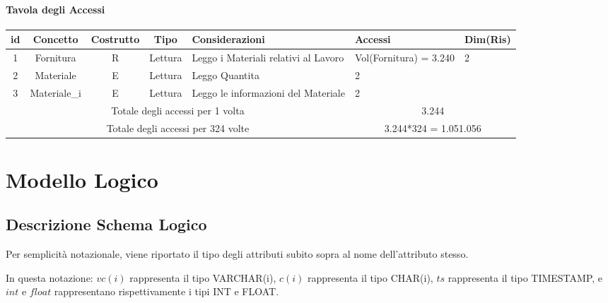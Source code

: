 \documentclass[12pt,a4paper]{report}
\begin{document}
        \subsection{Tavola degli Accessi}
        \begin{tabular}{|c|c|c|c|p{4cm}|p{3cm}|p{3cm}|}
            \hline
            \textbf{id} & \textbf{Concetto} & \textbf{Costrutto} & \textbf{Tipo} & \textbf{Considerazioni} & \textbf{Accessi} & \textbf{Dim(Ris)} \\ \hline
            1 & Fornitura & R & Lettura & Leggo i Materiali relativi al Lavoro & Vol(Fornitura) = 3.240 & 2 \\ \hline
            2 & Materiale & E & Lettura & Leggo Quantita & 2 & ~ \\ \hline
            3 & Materiale\_i & E & Lettura & Leggo le informazioni del Materiale & 2 & ~ \\ \hline
            \multicolumn{5}{|c|}{Totale degli accessi per 1 volta} & \multicolumn{2}{|c|}{3.244} \\ \hline
            \multicolumn{5}{|c|}{Totale degli accessi per 324 volte} & \multicolumn{2}{|c|}{3.244*324 = 1.051.056} \\ \hline
        \end{tabular}

\part{Modello Logico}

    \chapter{Descrizione Schema Logico}
    Per semplicità notazionale, viene riportato il tipo degli attributi subito sopra al nome dell'attributo stesso.

    In questa notazione: $vc(i)$ rappresenta il tipo VARCHAR(i), $c(i)$ rappresenta il tipo CHAR(i), $ts$ rappresenta il tipo TIMESTAMP, e $int$ e $float$ rappresentano rispettivamente i tipi INT e FLOAT.
\end{document}
